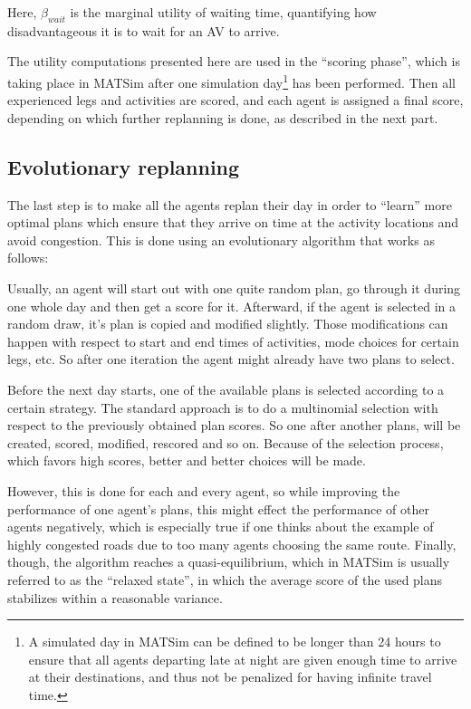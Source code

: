 Here, $\beta_{wait}$ is the marginal utility of waiting time, quantifying
how disadvantageous it is to wait for an AV to arrive.

The utility computations presented here are used in the ``scoring phase'', which
is taking place in MATSim after one simulation day\footnote{A simulated day in
MATSim can be defined to be longer than 24 hours to ensure that all agents departing
late at night are given enough time to arrive at their destinations, and thus not
be penalized for having infinite travel time.} has been performed. Then all experienced legs and activities are scored, and
each agent is assigned a final score, depending on which further replanning is done,
as described in the next part.

\subsection{Evolutionary replanning}

The last step is to make all the agents replan their day
in order to ``learn'' more optimal plans which
ensure that they arrive on time at the activity locations and avoid congestion.
This is done using an evolutionary algorithm that works as follows:

Usually, an agent will start out with one quite random plan, go through it during
one whole day and then get a score for it. Afterward, if the agent is selected in a random draw, it's plan is
copied and modified slightly. Those modifications can happen with respect
to start and end times of activities, mode choices for certain legs, etc. So after
one iteration the agent might already have two plans to select.

Before the next day starts, one of the available plans is selected according to a certain
strategy. The standard approach is to do a multinomial selection with respect to
the previously obtained plan scores. So one after another plans, will be created,
scored, modified, rescored and so on. Because of the selection process, which
favors high scores, better and better choices will be made.

However, this is done for each and every agent, so while improving the performance
of one agent's plans, this might effect the performance of other agents negatively,
which is especially true if one thinks about the example of highly congested roads
due to too many agents choosing the same route. Finally, though, the algorithm reaches
a quasi-equilibrium, which in MATSim is usually referred to as the ``relaxed
state'', in which the average score of the used plans stabilizes within a
reasonable variance.

